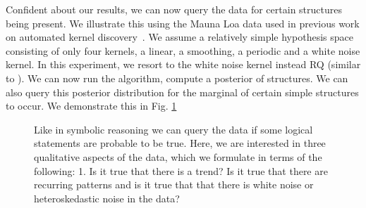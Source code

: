 Confident about our results, we can now query the data for certain structures being present. We illustrate this using the Mauna Loa data used in previous work on automated kernel discovery~\citep{duvenaud2013structure}. We assume a relatively simple hypothesis space  consisting of only four kernels, a linear, a smoothing, a periodic and a white noise kernel. In this experiment, we resort to the white noise kernel instead RQ (similar to \citep{lloyd2014automatic}).  We can now run the algorithm, compute a posterior of structures. We can also query this posterior distribution for the marginal of certain simple structures to occur. We demonstrate this in Fig. \ref{fig:query}
\begin{figure}
\centering

\caption{Like in symbolic reasoning we can query the data if some logical statements are probable to be true. Here, we are interested in three qualitative aspects of the data, which we formulate in terms of the following: 1. Is it true that there is a trend? Is it true that there are recurring patterns and is it true that that there is white noise or heteroskedastic noise in the data?}\label{fig:query}
\end{figure}